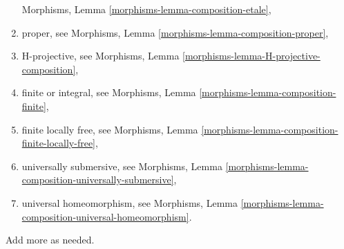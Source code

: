 \begin{remark}
\begin{enumerate}
Morphisms, Lemma \ref{morphisms-lemma-composition-etale},
\item proper, see
Morphisms, Lemma \ref{morphisms-lemma-composition-proper},
\item H-projective, see
Morphisms, Lemma \ref{morphisms-lemma-H-projective-composition},
\item finite or integral, see
Morphisms, Lemma \ref{morphisms-lemma-composition-finite},
\item finite locally free, see
Morphisms, Lemma \ref{morphisms-lemma-composition-finite-locally-free},
\item universally submersive, see
Morphisms, Lemma \ref{morphisms-lemma-composition-universally-submersive},
\item universal homeomorphism, see
Morphisms, Lemma \ref{morphisms-lemma-composition-universal-homeomorphism}.
\end{enumerate}
Add more as needed.
\end{remark}

